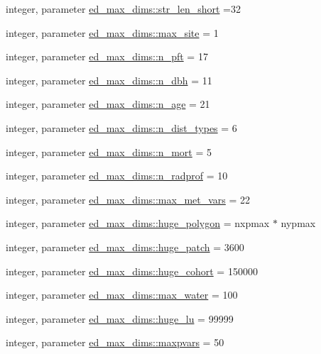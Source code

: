 \begin{DoxyCompactItemize}
integer, parameter \hyperlink{namespaceed__max__dims_aa0b83676744833979e6ea1e266859852}{ed\+\_\+max\+\_\+dims\+::str\+\_\+len\+\_\+short} =32
\item 
integer, parameter \hyperlink{namespaceed__max__dims_a4f9df14847da037dc8ff6f9c85086a62}{ed\+\_\+max\+\_\+dims\+::max\+\_\+site} = 1
\item 
integer, parameter \hyperlink{namespaceed__max__dims_ade9d322dcecc058458fce6b2093d5890}{ed\+\_\+max\+\_\+dims\+::n\+\_\+pft} = 17
\item 
integer, parameter \hyperlink{namespaceed__max__dims_a380455bae103b42e1281c4398372a696}{ed\+\_\+max\+\_\+dims\+::n\+\_\+dbh} = 11
\item 
integer, parameter \hyperlink{namespaceed__max__dims_a84ccb51c1637971b5b4b87c83b2b24ae}{ed\+\_\+max\+\_\+dims\+::n\+\_\+age} = 21
\item 
integer, parameter \hyperlink{namespaceed__max__dims_a7a8205408259fcb297b0cb04f549fe44}{ed\+\_\+max\+\_\+dims\+::n\+\_\+dist\+\_\+types} = 6
\item 
integer, parameter \hyperlink{namespaceed__max__dims_a8e6b880e0c740346e2450c60e80b8a09}{ed\+\_\+max\+\_\+dims\+::n\+\_\+mort} = 5
\item 
integer, parameter \hyperlink{namespaceed__max__dims_a33cf3454a80e938f8951d733d40b53d7}{ed\+\_\+max\+\_\+dims\+::n\+\_\+radprof} = 10
\item 
integer, parameter \hyperlink{namespaceed__max__dims_ad51de8cc1effd1c544a3987c0a6f4390}{ed\+\_\+max\+\_\+dims\+::max\+\_\+met\+\_\+vars} = 22
\item 
integer, parameter \hyperlink{namespaceed__max__dims_ab29e324be8290f305576594fd41c905a}{ed\+\_\+max\+\_\+dims\+::huge\+\_\+polygon} = nxpmax $\ast$ nypmax
\item 
integer, parameter \hyperlink{namespaceed__max__dims_a968dc04fd98ac746c6750e3540d49535}{ed\+\_\+max\+\_\+dims\+::huge\+\_\+patch} = 3600
\item 
integer, parameter \hyperlink{namespaceed__max__dims_a156b1cc088e31e7dc095c2cf33f775a0}{ed\+\_\+max\+\_\+dims\+::huge\+\_\+cohort} = 150000
\item 
integer, parameter \hyperlink{namespaceed__max__dims_a840d831a08084a2e9f939e28ef803b9a}{ed\+\_\+max\+\_\+dims\+::max\+\_\+water} = 100
\item 
integer, parameter \hyperlink{namespaceed__max__dims_a02ea3f49de6c06d652845010cf25c58b}{ed\+\_\+max\+\_\+dims\+::huge\+\_\+lu} = 99999
\item 
integer, parameter \hyperlink{namespaceed__max__dims_a8a123eff9f71a8d57c2b6d7cec1d3c5b}{ed\+\_\+max\+\_\+dims\+::maxpvars} = 50

\end{DoxyCompactItemize}
